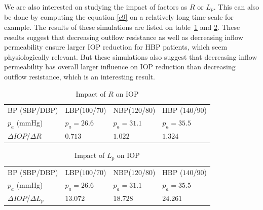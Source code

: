 We are also interested on studying the impact of  factors as $R$ or $L_p$. This can also be done by computing the equation \eqref{e9} on a relatively long time scale for example. The results of these simulations are listed on table~\ref{table:r} and \ref{table:lp}. These results suggest that decreasing outflow resistance as well as decreasing inflow permeability ensure larger IOP reduction for HBP patients, which seem physiologically relevant. But these simulations also suggest that decreasing inflow permeability has overall larger influence on IOP reduction than decreasing outflow resistance, which is an interesting result.
\begin{table}[h]
\begin{center}
\begin{tabular}{|l|l|l|l|}
\hline
BP (SBP/DBP)& LBP($100$/$70$)&NBP($120$/$80$) & HBP ($140$/$90$)\\
$p_a$ (mmHg)& $p_a = 26.6$ & $p_a = 31.1$ & $p_a = 35.5$\\
\hline
$\Delta IOP$/$\Delta R $& $0.713$ & $1.022$ & $1.324$\\
\hline
\end{tabular}
\caption{\label{table:r}Impact of $R$ on IOP}\end{center}
\end{table}
\begin{table}[h]
\begin{center}
\begin{tabular}{|l|l|l|l|}
\hline
BP (SBP/DBP)& LBP($100$/$70$)&NBP($120$/$80$) & HBP ($140$/$90$)\\
$p_a$ (mmHg)& $p_a = 26.6$ & $p_a = 31.1$ & $p_a = 35.5$\\
\hline
$\Delta IOP$/$\Delta L_p $& $13.072$ & $18.728$ & $24.261$\\
\hline
\end{tabular}
\end{center}
\caption{\label{table:lp}Impact of $L_p$ on IOP}
\end{table}

